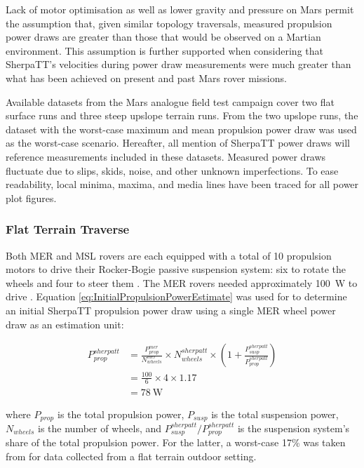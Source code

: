 Lack of motor optimisation as well as lower gravity and pressure on Mars permit the assumption that, given similar topology traversals, measured propulsion power draws are greater than those that would be observed on a Martian environment. This assumption is further supported when considering that SherpaTT's velocities during power draw measurements were much greater than what has been achieved on present and past Mars rover missions.

Available datasets from the Mars analogue field test campaign cover two flat surface runs and three steep upslope terrain runs. From the two upslope runs, the dataset with the worst-case maximum and mean propulsion power draw was used as the worst-case scenario. Hereafter, all mention of SherpaTT power draws will reference measurements included in these datasets. Measured power draws fluctuate due to slips, skids, noise, and other unknown imperfections. To ease readability, local minima, maxima, and media lines have been traced for all power plot figures.

\subsubsection{Flat Terrain Traverse}
\label{sec:PowerBudget:PropulsionPowerBudget:FlatTerrainTraverse}
Both \ac{MER} and \ac{MSL} rovers are each equipped with a total of 10 propulsion motors to drive their Rocker-Bogie passive suspension system: six to rotate the wheels and four to steer them  . The \ac{MER} rovers needed approximately \SI{100}{\watt} to drive . Equation \ref{eq:InitialPropulsionPowerEstimate} was used for to determine an initial SherpaTT propulsion power draw using a single \ac{MER} wheel power draw as an estimation unit:

\begin{align}
  \label{eq:InitialPropulsionPowerEstimate}
  P_{prop}^{sherpatt} &= \frac{P_{prop}^{mer}}{N_{wheels}^{mer}} \times N_{wheels}^{sherpatt} \times \left(1 +\frac{P_{susp}^{sherpatt}}{P_{prop}^{sherpatt}}\right) \\
           &= \frac{100}{6} \times 4 \times 1.17\\
           &= \SI{78}{\watt}
\end{align}


where $P_{prop}$ is the total propulsion power, $P_{susp}$ is the total suspension power, $N_{wheels}$ is the number of wheels, and $P_{susp}^{sherpatt} / P_{prop}^{sherpatt}$ is the suspension system's share of the total propulsion power. For the latter, a worst-case 17\% was taken from  for data collected from a flat terrain outdoor setting.

